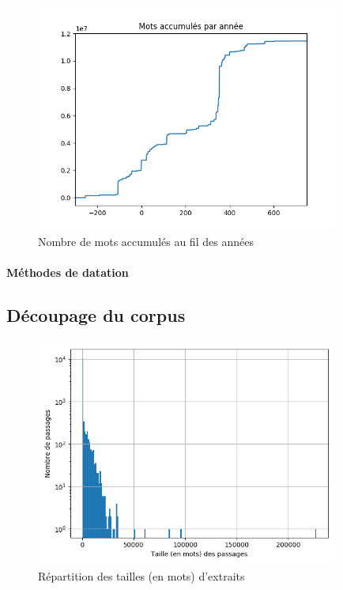 \begin{figure}
    \centering
    \includegraphics[width=10cm]{results/analysis/corpus_analysis/accumulated_tokens.png}
    \caption{Nombre de mots accumulés au fil des années}
    \label{accumulated_tokens_per_year}
\end{figure}


\paragraph{Méthodes de datation}

\subsection{Découpage du corpus}
\label{subsec:corpus_decoupage}

\begin{figure}
    \centering
    \includegraphics[width=10cm]{results/analysis/corpus_analysis/passage_size_distribution.png}
    \caption{Répartition des tailles (en mots) d'extraits}
    \label{passage_size_distribution}
\end{figure}

